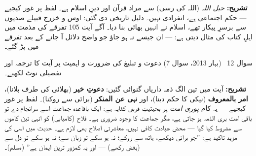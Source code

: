 \begin{hal}

\medskip
\textbf{تشریح:} \emph{حبل اللہ} (اللہ کی رسی) سے مراد قرآن اور دینِ اسلام ہے۔
لفظ  پر غور کیجیے --- حکم اجتماعی ہے، انفرادی نہیں۔ دلیل تاریخی
دی گئی: اوس و خزرج قبیلے صدیوں سے برسرِ پیکار تھے، اسلام نے انہیں بھائی بنا
دیا۔ آگے آیت \textenglish{105} تفرقے کی مذمت میں اہلِ کتاب کی مثال دیتی ہے:
 --- ان جیسے نہ ہو جاؤ جو واضح دلائل آ جانے کے بعد
تفرقے میں پڑ گئے۔
\end{hal}

\begin{sawal}{سوال \textenglish{12} \ \textnormal{\small(بہار \textenglish{2013}، سوال \textenglish{7})}}
دعوت و تبلیغ کی ضرورت و اہمیت پر آیت کا ترجمہ اور تفصیلی نوٹ لکھیے۔
\end{sawal}

\begin{hal}

\medskip
\textbf{تشریح:} آیت میں تین الگ ذمہ داریاں گنوائی گئیں: \textbf{دعوتِ خیر}
(بھلائی کی طرف بلانا)، \textbf{امر بالمعروف} (نیکی کا حکم دینا)، اور
\textbf{نہی عن المنکر} (برائی سے روکنا)۔ لفظ  پر غور کیجیے ---
یہ کام \emph{پوری امت} پر بحیثیتِ فرضِ کفایہ ہے: ایک باقاعدہ جماعت اسے
سرانجام دے تو باقی امت بری الذمہ ہو جاتی ہے، مگر جماعت کا وجود ضروری ہے۔
فلاح (کامیابی) کو انہی تین کاموں سے مشروط کیا گیا --- محض عبادت کافی نہیں،
معاشرتی اصلاح بھی لازم ہے۔ حدیث میں اسی کی مزید تاکید ہے: ''جو برائی دیکھے،
ہاتھ سے روکے؛ نہ ہو سکے تو زبان سے؛ نہ ہو سکے تو دل سے (بغض رکھے) --- اور یہ
کمزور ترین ایمان ہے'' (مسلم)۔
\end{hal}

